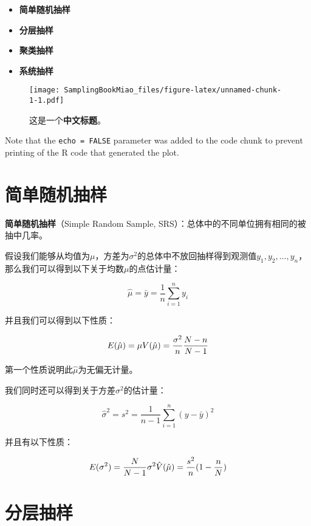 \documentclass[fontset=fandol,zihao=false,scheme=chinese,heading=true,UTF8]{ctexbook}
\providecommand{\tightlist}{%
  \setlength{\itemsep}{0pt}\setlength{\parskip}{0pt}}
\begin{document}
\begin{itemize}
\tightlist
\item
  \textbf{简单随机抽样}
\item
  \textbf{分层抽样}
\item
  \textbf{聚类抽样}
\item
  \textbf{系统抽样}
\end{itemize}



\begin{figure}
\centering
\texttt{[image: SamplingBookMiao\_files/figure-latex/unnamed-chunk-1-1.pdf]}
\caption{\label{fig:unnamed-chunk-1}这是一个\textbf{中文标题}。}
\end{figure}

Note that the \texttt{echo\ =\ FALSE} parameter was added to the code chunk to prevent printing of the R code that generated the plot.

\hypertarget{section-2}{%
\chapter{简单随机抽样}\label{section-2}}

\textbf{简单随机抽样}（Simple Random Sample, SRS）：总体中的不同单位拥有相同的被抽中几率。

假设我们能够从均值为\(\mu\)，方差为\(\sigma^2\)的总体中不放回抽样得到观测值\(y_1, y_2, \dots, y_n\)，那么我们可以得到以下关于均数\(\mu\)的点估计量：

\[\hat{\mu} = \bar{y} = \frac{1}{n}\sum_{i=1}^ny_i\]

并且我们可以得到以下性质：

\[
E(\hat{\mu}) = \mu\\
V(\hat{\mu}) = \frac{\sigma^2}{n}\frac{N-n}{N-1}
\]

第一个性质说明此\(\hat{\mu}\)为无偏无计量。

我们同时还可以得到关于方差\(\sigma^2\)的估计量：

\[\hat{\sigma}^2 = s^2 = \frac{1}{n-1}\sum_{i=1}^n(y-\bar{y})^2\]

并且有以下性质：

\[
E(\sigma^2) = \frac{N}{N-1}\sigma^2\\
\hat{V}(\hat{\mu}) = \frac{s^2}{n}(1-\frac{n}{N})
\]

\hypertarget{section-3}{%
\chapter{分层抽样}\label{section-3}}
\end{document}

